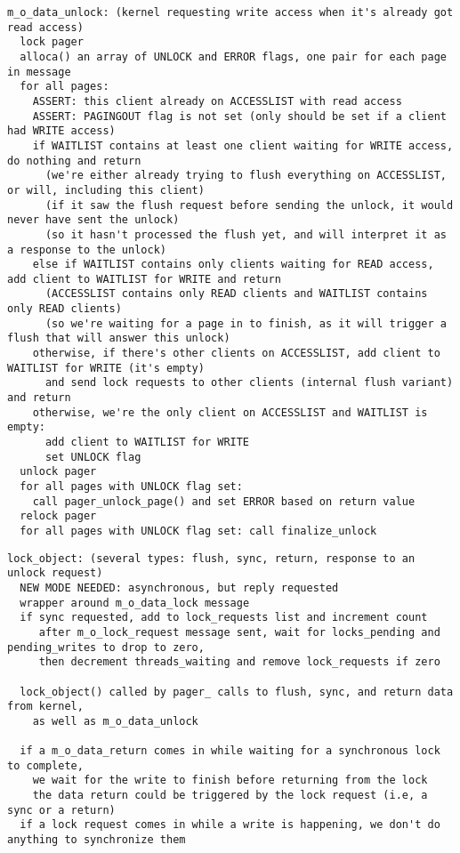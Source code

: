 \documentclass{article}
\begin{document}
\begin{verbatim}
m_o_data_unlock: (kernel requesting write access when it's already got read access)
  lock pager
  alloca() an array of UNLOCK and ERROR flags, one pair for each page in message
  for all pages:
    ASSERT: this client already on ACCESSLIST with read access
    ASSERT: PAGINGOUT flag is not set (only should be set if a client had WRITE access)
    if WAITLIST contains at least one client waiting for WRITE access, do nothing and return
      (we're either already trying to flush everything on ACCESSLIST, or will, including this client)
      (if it saw the flush request before sending the unlock, it would never have sent the unlock)
      (so it hasn't processed the flush yet, and will interpret it as a response to the unlock)
    else if WAITLIST contains only clients waiting for READ access, add client to WAITLIST for WRITE and return
      (ACCESSLIST contains only READ clients and WAITLIST contains only READ clients)
      (so we're waiting for a page in to finish, as it will trigger a flush that will answer this unlock)
    otherwise, if there's other clients on ACCESSLIST, add client to WAITLIST for WRITE (it's empty)
      and send lock requests to other clients (internal flush variant) and return
    otherwise, we're the only client on ACCESSLIST and WAITLIST is empty:
      add client to WAITLIST for WRITE
      set UNLOCK flag
  unlock pager
  for all pages with UNLOCK flag set:
    call pager_unlock_page() and set ERROR based on return value
  relock pager
  for all pages with UNLOCK flag set: call finalize_unlock
\end{verbatim}

\begin{verbatim}
lock_object: (several types: flush, sync, return, response to an unlock request)
  NEW MODE NEEDED: asynchronous, but reply requested
  wrapper around m_o_data_lock message
  if sync requested, add to lock_requests list and increment count
     after m_o_lock_request message sent, wait for locks_pending and pending_writes to drop to zero,
     then decrement threads_waiting and remove lock_requests if zero

  lock_object() called by pager_ calls to flush, sync, and return data from kernel,
    as well as m_o_data_unlock

  if a m_o_data_return comes in while waiting for a synchronous lock to complete,
    we wait for the write to finish before returning from the lock
    the data return could be triggered by the lock request (i.e, a sync or a return)
  if a lock request comes in while a write is happening, we don't do anything to synchronize them
\end{verbatim}
\end{document}

